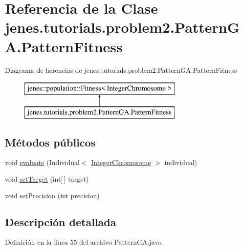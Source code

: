 \hypertarget{classjenes_1_1tutorials_1_1problem2_1_1_pattern_g_a_1_1_pattern_fitness}{\section{Referencia de la Clase jenes.\-tutorials.\-problem2.\-Pattern\-G\-A.\-Pattern\-Fitness}
\label{classjenes_1_1tutorials_1_1problem2_1_1_pattern_g_a_1_1_pattern_fitness}
}
Diagrama de herencias de jenes.\-tutorials.\-problem2.\-Pattern\-G\-A.\-Pattern\-Fitness\begin{figure}[H]
\begin{center}
\leavevmode
\includegraphics[height=2.000000cm]{classjenes_1_1tutorials_1_1problem2_1_1_pattern_g_a_1_1_pattern_fitness}
\end{center}
\end{figure}
\subsection*{Métodos públicos}
\begin{DoxyCompactItemize}
\item 
void \hyperlink{classjenes_1_1tutorials_1_1problem2_1_1_pattern_g_a_1_1_pattern_fitness_a29d36d1fc46742486419d4959d9d0c4a}{evaluate} (Individual$<$ \hyperlink{classjenes_1_1chromosome_1_1_integer_chromosome}{Integer\-Chromosome} $>$ individual)
\item 
void \hyperlink{classjenes_1_1tutorials_1_1problem2_1_1_pattern_g_a_1_1_pattern_fitness_a2e872fcc0738eb711d5ab5e549ca745b}{set\-Target} (int\mbox{[}$\,$\mbox{]} target)
\item 
void \hyperlink{classjenes_1_1tutorials_1_1problem2_1_1_pattern_g_a_1_1_pattern_fitness_a19aca4cdfc7c8e33462a15022d4c7a54}{set\-Precision} (int precision)
\end{DoxyCompactItemize}


\subsection{Descripción detallada}


Definición en la línea 55 del archivo Pattern\-G\-A.\-java.



